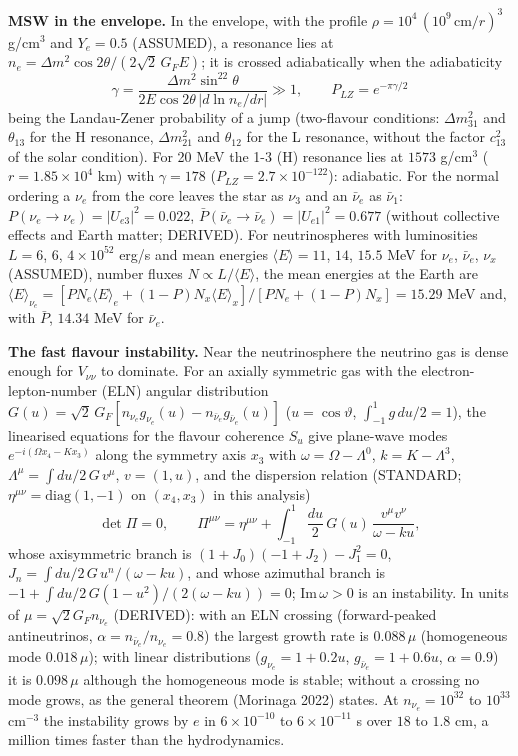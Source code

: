 \documentclass[
  10pt,
]{article}
\begin{document}
\textbf{MSW in the envelope.} In the envelope, with the profile
\(\rho = 10^4\,(10^9\,\text{cm}/r)^3\) g/cm\(^3\) and \(Y_e = 0.5\)
(ASSUMED), a resonance lies at
\(n_e = \Delta m^2\cos2\theta/(2\sqrt2\,G_FE)\); it is crossed
adiabatically when the adiabaticity
\[ \gamma = \frac{\Delta m^2\sin^22\theta}{2E\cos2\theta\,\lvert d\ln n_e/dr\rvert} \gg 1,\qquad P_{LZ} = e^{-\pi\gamma/2} \]
being the Landau-Zener probability of a jump (two-flavour conditions:
\(\Delta m^2_{31}\) and \(\theta_{13}\) for the H resonance,
\(\Delta m^2_{21}\) and \(\theta_{12}\) for the L resonance, without the
factor \(c_{13}^2\) of the solar condition). For 20 MeV the 1-3 (H)
resonance lies at \(1573\) g/cm\(^3\) (\(r = 1.85\times10^4\) km) with
\(\gamma = 178\) (\(P_{LZ} = 2.7\times10^{-122}\)): adiabatic. For the
normal ordering a \(\nu_e\) from the core leaves the star as \(\nu_3\)
and an \(\bar\nu_e\) as \(\bar\nu_1\):
\(P(\nu_e\to\nu_e) = \lvert U_{e3}\rvert^2 = 0.022\),
\(\bar P(\bar\nu_e\to\bar\nu_e) = \lvert U_{e1}\rvert^2 = 0.677\)
(without collective effects and Earth matter; DERIVED). For
neutrinospheres with luminosities \(L = 6\), \(6\), \(4\times10^{52}\)
erg/s and mean energies \(\langle E\rangle = 11\), \(14\), \(15.5\) MeV
for \(\nu_e\), \(\bar\nu_e\), \(\nu_x\) (ASSUMED), number fluxes
\(N \propto L/\langle E\rangle\), the mean energies at the Earth are
\(\langle E\rangle_{\nu_e} = [PN_e\langle E\rangle_e + (1 - P)N_x\langle E\rangle_x]/[PN_e + (1 - P)N_x] = 15.29\)
MeV and, with \(\bar P\), \(14.34\) MeV for \(\bar\nu_e\).

\textbf{The fast flavour instability.} Near the neutrinosphere the
neutrino gas is dense enough for \(V_{\nu\nu}\) to dominate. For an
axially symmetric gas with the electron-lepton-number (ELN) angular
distribution
\(G(u) = \sqrt2\,G_F[n_{\nu_e}g_{\nu_e}(u) - n_{\bar\nu_e}g_{\bar\nu_e}(u)]\)
(\(u = \cos\vartheta\), \(\int_{-1}^{1}g\,du/2 = 1\)), the linearised
equations for the flavour coherence \(S_u\) give plane-wave modes
\(e^{-i(\Omega x_4 - Kx_3)}\) along the symmetry axis \(x_3\) with
\(\omega = \Omega - \Lambda^0\), \(k = K - \Lambda^3\),
\(\Lambda^\mu = \int du/2\,G\,v^\mu\), \(v = (1, u)\), and the
dispersion relation (STANDARD; \(\eta^{\mu\nu} = \mathrm{diag}(1, -1)\)
on \((x_4, x_3)\) in this analysis)
\[ \det\Pi = 0,\qquad \Pi^{\mu\nu} = \eta^{\mu\nu} + \int_{-1}^{1}\frac{du}{2}\,G(u)\,\frac{v^\mu v^\nu}{\omega - ku}, \]
whose axisymmetric branch is \((1 + J_0)(-1 + J_2) - J_1^2 = 0\),
\(J_n = \int du/2\,G\,u^n/(\omega - ku)\), and whose azimuthal branch is
\(-1 + \int du/2\,G(1 - u^2)/(2(\omega - ku)) = 0\);
\(\mathrm{Im}\,\omega > 0\) is an instability. In units of
\(\mu = \sqrt2G_Fn_{\nu_e}\) (DERIVED): with an ELN crossing
(forward-peaked antineutrinos,
\(\alpha = n_{\bar\nu_e}/n_{\nu_e} = 0.8\)) the largest growth rate is
\(0.088\,\mu\) (homogeneous mode \(0.018\,\mu\)); with linear
distributions (\(g_{\nu_e} = 1 + 0.2u\), \(g_{\bar\nu_e} = 1 + 0.6u\),
\(\alpha = 0.9\)) it is \(0.098\,\mu\) although the homogeneous mode is
stable; without a crossing no mode grows, as the general theorem
(Morinaga 2022) states. At \(n_{\nu_e} = 10^{32}\) to \(10^{33}\)
cm\(^{-3}\) the instability grows by \(e\) in \(6\times10^{-10}\) to
\(6\times10^{-11}\) s over \(18\) to \(1.8\) cm, a million times faster
than the hydrodynamics.
\end{document}
